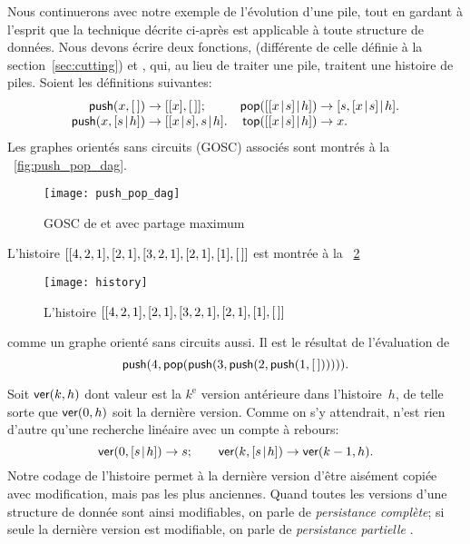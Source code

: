 Nous continuerons avec notre exemple de l'évolution d'une pile, tout
en gardant à l'esprit que la technique décrite ci-après est applicable
à toute structure de données. Nous devons écrire deux fonctions,
 (différente de celle définie à
la section~\ref{sec:cutting}) et ,
qui, au lieu de traiter une pile, traitent une histoire de
piles. Soient les définitions suivantes:
\begin{equation}
\begin{array}{@{}r@{\;}c@{\;}l@{\quad}r@{\;}c@{\;}l@{}}
\fun{push}(x,\el) & \rightarrow & [[x],\el];
& \fun{pop}(\cons{\cons{x}{s}}{h}) & \rightarrow &
                                     \cons{s,\cons{x}{s}}{h}.\\
\fun{push}(x,\cons{s}{h}) & \rightarrow &
\cons{\cons{x}{s},s}{h}. &
\fun{top}(\cons{\cons{x}{s}}{h}) & \rightarrow & x.
\end{array}
\label{eq:push_pop_persistence}
\end{equation}
Les graphes orientés sans circuits (GOSC) associés sont montrés à la
\fig~\vref{fig:push_pop_dag}.
\begin{figure}[t]
\centering
\texttt{[image: push\_pop\_dag]}
\caption{GOSC de  et  avec partage maximum}
\label{fig:push_pop_dag}
\end{figure}
L'histoire \([[4,2,1],[2,1],[3,2,1],[2,1],[1],[\,]]\) est montrée
à la \fig~\ref{fig:history}
\begin{figure}
\centering
\texttt{[image: history]}
\caption{L'histoire \([[4,2,1],[2,1],[3,2,1],[2,1],[1],[\,]]\)}
\label{fig:history}
\end{figure}
comme un graphe orienté sans circuits aussi. Il est le résultat de
l'évaluation de
\begin{equation}
\textsf{push}(4, \textsf{pop}(\textsf{push}(3, \textsf{push}(2,
\textsf{push}(1, [\,]))))).
\label{ex_history}
\end{equation}

Soit \(\textsf{ver}(k,h)\)  dont valeur est la
\(k^\text{e}\) version antérieure dans l'histoire~\(h\), de telle
sorte que \(\textsf{ver}(0,h)\) soit la dernière version. Comme on s'y
attendrait,  n'est rien d'autre qu'une recherche linéaire
avec un compte à rebours:
\begin{equation*}
\textsf{ver}(0,[{s}\!\mid\!{h}]) \rightarrow s;\qquad
\textsf{ver}(k,[{s}\!\mid\!{h}]) \rightarrow \textsf{ver}(k-1,h).
\end{equation*}
Notre codage de l'histoire permet à la dernière version d'être
aisément copiée avec modification, mais pas les plus anciennes. Quand
toutes les versions d'une structure de donnée sont ainsi modifiables,
on parle de \emph{persistance complète}; si seule la dernière version est modifiable, on parle de
\emph{persistance partielle}
\citep{MehlhornTsakalidis_1990}.

